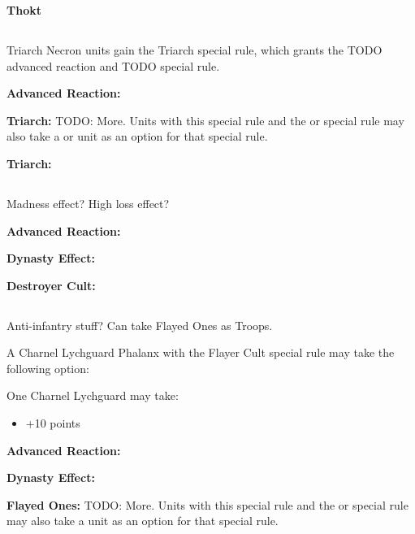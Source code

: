 \textbf{Thokt}


\newpage
\subsection[Triarch]{}

Triarch Necron units gain the Triarch special rule, which grants the TODO advanced reaction and TODO special rule.

\textbf{Advanced Reaction:}

\textbf{Triarch:} TODO: More. Units with this special rule and the  or  special rule may also take a  or  unit as an option for that special rule.

\textbf{Triarch:}


\newpage
\subsection[Destroyer Cult]{}

Madness effect? High loss effect?

\textbf{Advanced Reaction:}

\textbf{Dynasty Effect:}

\textbf{Destroyer Cult:}


\newpage
\subsection[Flayed Ones]{}

Anti-infantry stuff?
Can take Flayed Ones as Troops.

A Charnel Lychguard Phalanx with the Flayer Cult special rule may take the following option:

One Charnel Lychguard may take:
\begin{itemize}
	\item {} \dotfill +10 points
\end{itemize} 

\textbf{Advanced Reaction:}

\textbf{Dynasty Effect:}

\textbf{Flayed Ones:} TODO: More. Units with this special rule and the  or  special rule may also take a  unit as an option for that special rule.

